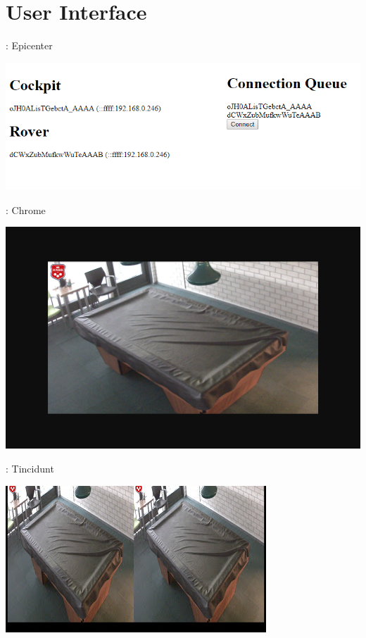 \section{User Interface}

\begin{frame}{\secname: Epicenter}
	\begin{center}
		\includegraphics[width=\linewidth]{images/epicenter.png}
	\end{center}
\end{frame}

\begin{frame}{\secname: Chrome}
	\begin{center}
		\includegraphics[width=\linewidth]{images/chrome.png}
	\end{center}
\end{frame}

\begin{frame}{\secname: Tincidunt}
	\begin{center}
		\includegraphics[width=\linewidth]{images/tincidunt.png}
	\end{center}
\end{frame}
